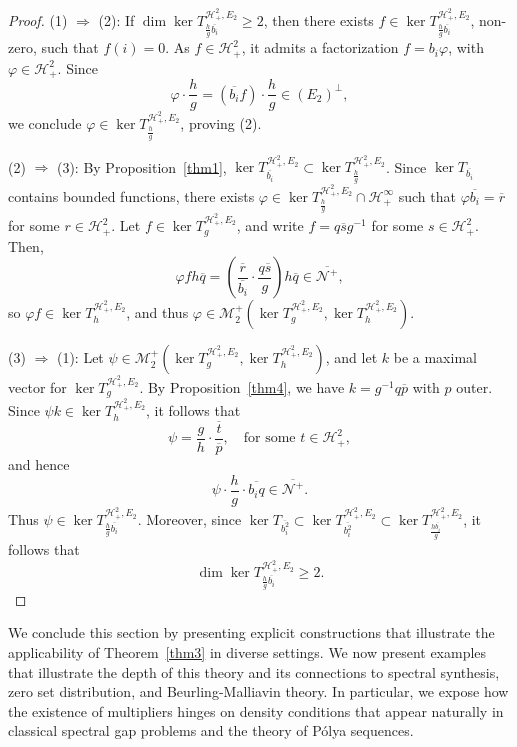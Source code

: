 \documentclass[12pt,a4paper]{amsart}
\begin{document}
\begin{proof}
(1) \( \Rightarrow \) (2): If \( \dim \ker T_{\frac{h}{g} \overline{b_i}}^{\mathcal{H}^2_+, E_2} \ge 2 \), then there exists \( f \in \ker T_{\frac{h}{g} \overline{b_i}}^{\mathcal{H}^2_+, E_2} \), non-zero, such that \( f(i) = 0 \). As \( f \in \mathcal{H}^2_+ \), it admits a factorization \( f = b_i \varphi \), with \( \varphi \in \mathcal{H}^2_+ \). Since
\[
\varphi \cdot \frac{h}{g} = \left( \overline{b_i} f \right) \cdot \frac{h}{g} \in (E_2)^\perp,
\]
we conclude \( \varphi \in \ker T_{\frac{h}{g}}^{\mathcal{H}^2_+, E_2} \), proving (2).

(2) \( \Rightarrow \) (3): By Proposition~\ref{thm1}, \( \ker T_{\overline{b_i}}^{\mathcal{H}^2_+, E_2} \subset \ker T_{\frac{h}{g}}^{\mathcal{H}^2_+, E_2} \). Since \( \ker T_{\overline{b_i}} \) contains bounded functions, there exists \( \varphi \in \ker T_{\frac{h}{g}}^{\mathcal{H}^2_+, E_2} \cap \mathcal{H}_+^\infty \) such that \( \varphi \overline{b_i} = \overline{r} \) for some \( r \in \mathcal{H}^2_+ \). Let \( f \in \ker T_g^{\mathcal{H}^2_+, E_2} \), and write \( f = q\overline{s} g^{-1} \) for some \( s \in \mathcal{H}^2_+ \). Then,
\[
\varphi f h \overline{q} = \left( \frac{\overline{r}}{\overline{b_i}} \cdot \frac{q \overline{s}}{g} \right) h \overline{q} \in \overline{\mathcal{N}^+},
\]
so \( \varphi f \in \ker T_h^{\mathcal{H}^2_+, E_2} \), and thus \( \varphi \in \mathcal{M}_2^+(\ker T_g^{\mathcal{H}^2_+, E_2}, \ker T_h^{\mathcal{H}^2_+, E_2}) \).

(3) \( \Rightarrow \) (1): Let \( \psi \in \mathcal{M}_2^+(\ker T_g^{\mathcal{H}^2_+, E_2}, \ker T_h^{\mathcal{H}^2_+, E_2}) \), and let \( k \) be a maximal vector for \( \ker T_g^{\mathcal{H}^2_+, E_2} \). By Proposition~\ref{thm4}, we have \( k = g^{-1} q \overline{p} \) with \( p \) outer. Since \( \psi k \in \ker T_h^{\mathcal{H}^2_+, E_2} \), it follows that
\[
\psi = \frac{g}{h} \cdot \frac{\overline{t}}{\overline{p}}, \quad \text{for some } t \in \mathcal{H}^2_+,
\]
and hence
\[
\psi \cdot \frac{h}{g} \cdot \overline{b_i q} \in \overline{\mathcal{N}^+}.
\]
Thus \( \psi \in \ker T_{\frac{h}{g} \overline{b_i}}^{\mathcal{H}^2_+, E_2} \). Moreover, since \( \ker T_{\overline{b_i^2}} \subset \ker T_{\overline{b_i^2}}^{\mathcal{H}^2_+, E_2} \subset \ker T_{\frac{h \overline{b_i}}{g}}^{\mathcal{H}^2_+, E_2} \), it follows that
\[
\dim \ker T_{\frac{h}{g} \overline{b_i}}^{\mathcal{H}^2_+, E_2} \ge 2.
\]
\end{proof}

We conclude this section by presenting explicit constructions that illustrate the applicability of Theorem~\ref{thm3} in diverse settings. We now present examples that illustrate the depth of this theory and its connections to spectral synthesis, zero set distribution, and Beurling-Malliavin theory. In particular, we expose how the existence of multipliers hinges on density conditions that appear naturally in classical spectral gap problems and the theory of Pólya sequences.
\end{document}
